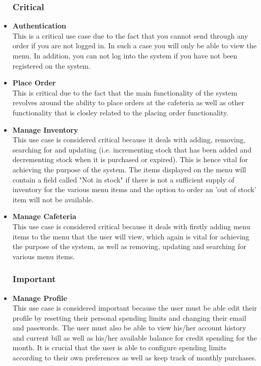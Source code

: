 \documentclass[a4paper,12pt]{article}
\begin{document}
\begin{itemize}

\subsubsection{Critical}
\item \textbf{Authentication} \\
This is a critical use case due to the fact that you cannot send through any order if you are not logged in. In such a case you will only be able to view the menu. In addition, you can not log into the system if you have not been registered on the system.

\item \textbf{Place Order}\\
This is critical due to the fact that the main functionality of the system revolves around the ability to place orders at the cafeteria as well as other functionality that is closley related to the placing order functionality.

\item \textbf{Manage Inventory} \\
This use case is considered critical because it deals with adding, removing, searching for and updating (i.e. incrementing stock that has been added and decrementing stock when it is purchased or expired). This is hence vital for achieving the purpose of the system. The items displayed on the menu will contain a field called "Not in stock" if there is not a sufficient supply of inventory for the various menu items and the option to order an 'out of stock' item will not be available. 

\item \textbf{Manage Cafeteria} \\
This use case is considered critical because it deals with firstly adding menu items to the menu that the user will view, which again is vital for achieving the purpose of the system, as well as removing, updating and searching for various menu items. 

\subsubsection{Important}
\item \textbf{Manage Profile} \\
This use case is considered important because the user must be able edit their profile by resetting their personal spending limits and changing their email and passwords. The user must also be able to view his/her account history and current bill as well as his/her available balance for credit spending for the month. It is crucial that the user is able to configure spending limits according to their own preferences as well as keep track of monthly purchases.


\end{itemize}
\end{document}
